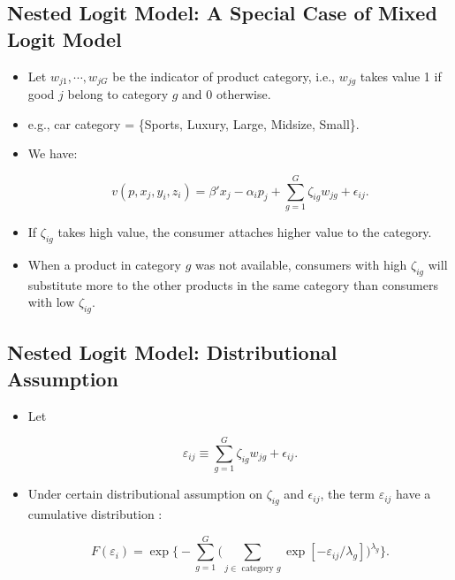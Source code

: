 \documentclass[]{book}
\providecommand{\tightlist}{%
  \setlength{\itemsep}{0pt}\setlength{\parskip}{0pt}}
\begin{document}
\subsection{Nested Logit Model: A Special Case of Mixed Logit
Model}\label{nested-logit-model-a-special-case-of-mixed-logit-model}

\begin{itemize}
\tightlist
\item
  Let \(w_{j1}, \cdots, w_{jG}\) be the indicator of product category,
  i.e., \(w_{jg}\) takes value 1 if good \(j\) belong to category \(g\)
  and 0 otherwise.
\item
  e.g., car category = \{Sports, Luxury, Large, Midsize, Small\}.
\item
  We have:

  \begin{equation}
  v(p, x_j, y_i, z_i) = \beta'x_j - \alpha_i p_j + \sum_{g = 1}^G \zeta_{ig} w_{jg} + \epsilon_{ij}.
  \end{equation}
\item
  If \(\zeta_{ig}\) takes high value, the consumer attaches higher value
  to the category.
\item
  When a product in category \(g\) was not available, consumers with
  high \(\zeta_{ig}\) will substitute more to the other products in the
  same category than consumers with low \(\zeta_{ig}\).
\end{itemize}

\subsection{Nested Logit Model: Distributional
Assumption}\label{nested-logit-model-distributional-assumption}

\begin{itemize}
\tightlist
\item
  Let

  \begin{equation}
  \varepsilon_{ij} \equiv \sum_{g = 1}^G \zeta_{ig} w_{jg} + \epsilon_{ij}.
  \end{equation}
\item
  Under certain distributional assumption on \(\zeta_{ig}\) and
  \(\epsilon_{ij}\), the term \(\varepsilon_{ij}\) have a cumulative
  distribution \citep{Cardell1997}:

  \begin{equation}
  F(\varepsilon_i) = \exp\Bigg\{- \sum_{g = 1}^G \Bigg(\sum_{j \in \text{   category   } g} \exp[-\varepsilon_{ij}/\lambda_g] \Bigg)^{\lambda_g}  \Bigg\}.
  \end{equation}
\end{itemize}
\end{document}
